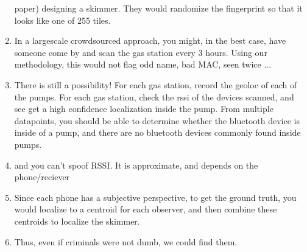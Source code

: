 \begin{enumerate}
paper) designing a skimmer. They would randomize the fingerprint so that
it looks like one of 255 tiles.
\item    In a largescale crowdsourced approach, you might, in the best case,
   have someone come by and scan the gas station every 3 hours. Using our
   methodology, this would not flag odd name, bad MAC, seen twice ... 
\item    There is still a possibility! For each gas station, record the geoloc
   of each of the pumps. For each gas station, check the rssi of the devices
   scanned, and see get a high confidence localization inside the pump. From
   multiple datapoints, you should be able to determine whether the bluetooth
   device is inside of a pump, and there are no bluetooth devices commonly found
   inside pumps.
\item    and you can't spoof RSSI. It is approximate, and depends on the phone/reciever
\item    Since each phone has a subjective perspective, to get the ground truth, you
   would localize to a centroid for each observer, and then combine these centroids
   to localize the skimmer.
\item    Thus, even if criminals were not dumb, we could find them.
\end{enumerate}


